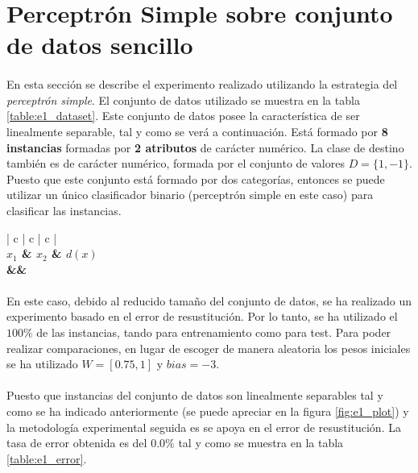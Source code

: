 \documentclass{article}
\begin{document}
	\section{Perceptrón Simple sobre conjunto de datos sencillo}
	\label{sec:e1}

		\paragraph{}
		En esta sección se describe el experimento realizado utilizando la estrategia del \emph{perceptrón simple}. El conjunto de datos utilizado se muestra en la tabla \ref{table:e1_dataset}. Este conjunto de datos posee la característica de ser linealmente separable, tal y como se verá a continuación. Está formado por \textbf{8 instancias} formadas por \textbf{2 atributos} de carácter numérico. La clase de destino también es de carácter numérico, formada por el conjunto de valores $D = \{1,-1\}$. Puesto que este conjunto está formado por dos categorías, entonces se puede utilizar un único clasificador binario (perceptrón simple en este caso) para clasificar las instancias.

		\begin{table}[H]
			\centering
			\begin{tabu}{ | c | c | c |}
				\hline
				 \\ \hline
				\bfseries $x_1$ & \bfseries $x_2$ & \bfseries $d(x)$
				{\\\hline\one&\two&\three}
				\\\hline
			\end{tabu}
			\caption{Conjunto de datos Simple}
			\label{table:e1_dataset}
		\end{table}

		\paragraph{}
		En este caso, debido al reducido tamaño del conjunto de datos, se ha realizado un experimento basado en el error de resustitución. Por lo tanto, se ha utilizado el $100\%$ de las instancias, tando para entrenamiento como para test. Para poder realizar comparaciones, en lugar de escoger de manera aleatoria los pesos iniciales se ha utilizado $W = [0.75,1]$ y $bias = -3$.

		\paragraph{}
		Puesto que instancias del conjunto de datos son linealmente separables tal y como se ha indicado anteriormente (se puede apreciar en la figura \ref{fig:e1_plot}) y la metodología experimental seguida es se apoya en el error de resustitución. La tasa de error obtenida es del $0.0\%$ tal y como se muestra en la tabla \ref{table:e1_error}.
\end{document}
